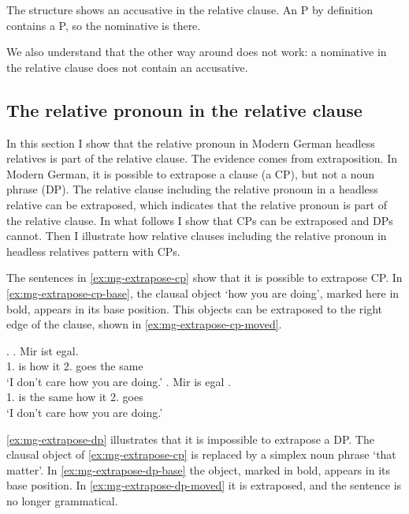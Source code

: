 The structure shows an accusative in the relative clause. An P by definition contains a P, so the nominative is there.

We also understand that the other way around does not work: a nominative in the relative clause does not contain an accusative.


\subsection{The relative pronoun in the relative clause}

In this section I show that the relative pronoun in Modern German headless relatives is part of the relative clause. The evidence comes from extraposition. In Modern German, it is possible to extrapose a clause (a CP), but not a noun phrase (DP). The relative clause including the relative pronoun in a headless relative can be extraposed, which indicates that the relative pronoun is part of the relative clause. In what follows I show that CPs can be extraposed and DPs cannot. Then I illustrate how relative clauses including the relative pronoun in headless relatives pattern with CPs.

The sentences in \ref{ex:mg-extrapose-cp} show that it is possible to extrapose CP. In \ref{ex:mg-extrapose-cp-base}, the clausal object  `how you are doing', marked here in bold, appears in its base position. This objects can be extraposed to the right edge of the clause, shown in \ref{ex:mg-extrapose-cp-moved}.

\ex.\label{ex:mg-extrapose-cp}
\ag. Mir ist     egal.\\
 1. is how it 2. goes {the same}\\
 `I don't care how you are doing.' \label{ex:mg-extrapose-cp-base}
\bg. Mir is egal    .\\
 1. is {the same} how it 2. goes\\
 `I don't care how you are doing.' \label{ex:mg-extrapose-cp-moved}

\ref{ex:mg-extrapose-dp} illustrates that it is impossible to extrapose a DP. The clausal object of \ref{ex:mg-extrapose-cp} is replaced by a simplex noun phrase  `that matter'.
In \ref{ex:mg-extrapose-dp-base} the object, marked in bold, appears in its base position. In \ref{ex:mg-extrapose-dp-moved} it is extraposed, and the sentence is no longer grammatical.

